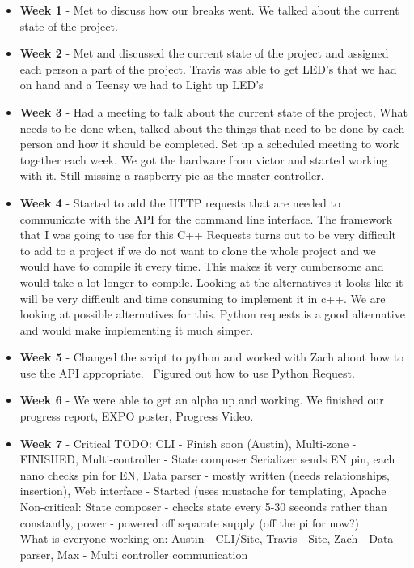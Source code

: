 \documentclass[onecolumn, draftclsnofoot,10pt, compsoc]{IEEEtran}
\begin{document}
				\begin{itemize}
					\item \textbf{Week 1} - Met to discuss how our breaks went. We talked about the current state of the project.
					\item \textbf{Week 2} - Met and discussed the current state of the project and assigned each person a part of the project.  Travis was able to get LED's that we had on hand and a Teensy we had to Light up LED's 
					\item \textbf{Week 3} - Had a meeting to talk about the current state of the project, What needs to be done when, talked about the things that need to be done by each person and how it should be completed. Set up a scheduled meeting to work together each week. We got the hardware from victor and started working with it. Still missing a raspberry pie as the master controller.  
					\item \textbf{Week 4} - Started to add the HTTP requests that are needed to communicate with the API for the command line interface. The framework that I was going to use for this C++ Requests turns out to be very difficult to add to a project if we do not want to clone the whole project and we would have to compile it every time. This makes it very cumbersome and would take a lot longer to compile. Looking at the alternatives it looks like it will be very difficult and time consuming to implement it in c++. We are looking at possible alternatives for this. Python requests is a good alternative and would make implementing it much simper.  
					\item \textbf{Week 5} - Changed the script to python and worked with Zach about how to use the API appropriate.  Figured out how to use Python Request.
					\item \textbf{Week 6} - We were able to get an alpha up and working. We finished our progress report, EXPO poster, Progress Video.
					\item \textbf{Week 7} - Critical TODO: CLI - Finish soon (Austin), Multi-zone - FINISHED, Multi-controller - State composer Serializer sends EN pin, each nano checks pin for EN, Data parser - mostly written (needs relationships, insertion), Web interface - Started (uses mustache for templating, Apache 
											\\ Non-critical: State composer - checks state every 5-30 seconds rather than constantly, power - powered off separate supply (off the pi for now?) 
											\\ What is everyone working on: Austin - CLI/Site, Travis - Site, Zach - Data parser, Max - Multi controller communication 

\end{itemize}
\end{document}

